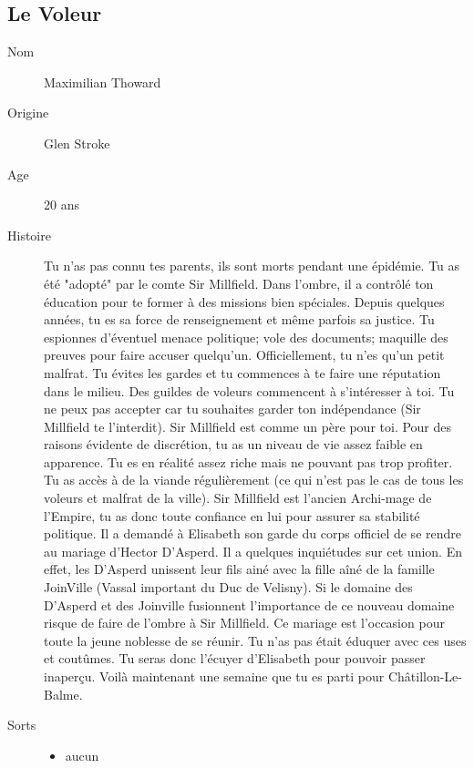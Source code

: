 \documentclass[oneside,12pt]{book}
\begin{document}
\begin{flushleft}
\subsection{Le Voleur}
\begin{description}
\item[Nom]{ Maximilian Thoward}
\item[Origine]{Glen Stroke}
\item[Age]{20 ans}
\item[Histoire]{Tu n'as pas connu tes parents, ils sont morts pendant une épidémie. Tu as été "adopté" par le comte Sir Millfield. Dans l'ombre, il a contrôlé ton éducation pour te former à des missions bien spéciales. Depuis quelques années, tu es sa force de renseignement et même parfois sa justice. Tu espionnes d'éventuel menace politique; vole des documents; maquille des preuves pour faire accuser quelqu'un. Officiellement, tu n'es qu'un petit malfrat. Tu évites les gardes et tu commences à te faire une réputation dans le milieu. Des guildes de voleurs commencent à s'intéresser à toi. Tu ne peux pas accepter car tu souhaites garder ton indépendance (Sir Millfield te l'interdit). 
Sir Millfield est comme un père pour toi. Pour des raisons évidente de discrétion, tu as un niveau de vie assez faible en apparence. Tu es en réalité assez riche mais ne pouvant pas trop profiter. Tu as accès à de la viande régulièrement (ce qui n'est pas le cas de tous les voleurs et malfrat de la ville). Sir Millfield est l'ancien Archi-mage de l'Empire, tu as donc toute confiance en lui pour assurer sa stabilité politique. Il a demandé à Elisabeth son garde du corps officiel de se rendre au mariage d'Hector D'Asperd. Il a quelques inquiétudes sur cet union. En effet, les D'Asperd unissent leur fils ainé avec la fille aîné de la famille JoinVille (Vassal important du Duc de Velisny). Si le domaine des D'Asperd et des Joinville fusionnent l'importance de ce nouveau domaine risque de faire de l'ombre à Sir Millfield. Ce mariage est l'occasion pour toute la jeune noblesse de se réunir. Tu n'as pas était éduquer avec ces uses et coutûmes. Tu seras donc l'écuyer d'Elisabeth pour pouvoir passer inaperçu. Voilà maintenant une semaine que tu es parti pour Châtillon-Le-Balme.  }
\item[Sorts]{
\begin{itemize}
\item aucun
\end{itemize}
}
\end{description}
\clearpage


\end{flushleft}
\end{document}
